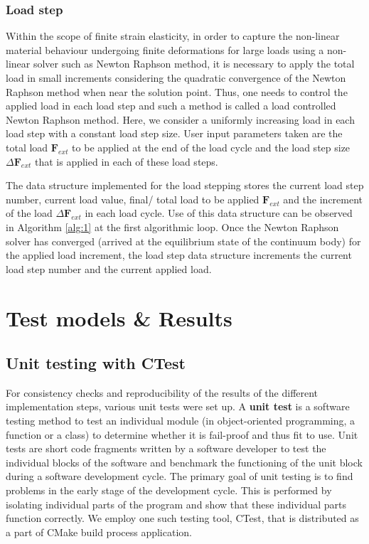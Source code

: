 \documentclass[11pt,a4paper,final]{article}
\begin{document}
\subsubsection{Load step}
Within the scope of finite strain elasticity, in order to capture the non-linear material behaviour undergoing finite deformations for large loads using a non-linear solver such as Newton Raphson method, it is necessary to apply the total load in small increments considering the quadratic convergence of the Newton Raphson method when near the solution point. Thus, one needs to control the applied load in each load step and such a method is called a load controlled Newton Raphson method. Here, we consider a uniformly increasing load in each load step with a constant load step size. User input parameters taken are the total load $\mathbf{F}_{ext}$ to be applied at the end of the load cycle and the load step size $\Delta \mathbf{F}_{ext}$ that is applied in each of these load steps. \par 
The data structure implemented for the load stepping stores the current load step number, current load value, final/ total load to be applied $\mathbf{F}_{ext}$ and the increment of the load $\Delta \mathbf{F}_{ext}$ in each load cycle. Use of this data structure can be observed in Algorithm \eqref{alg:1} at the first algorithmic loop. Once the Newton Raphson solver has converged (arrived at the equilibrium state of the continuum body) for the applied load increment, the load step data structure increments the current load step number and the current applied load.
 
\section{Test models \& Results}

\subsection{Unit testing with CTest}
For consistency checks and reproducibility of the results of the different implementation steps, various unit tests were set up. A \textbf{unit test} is a software testing method to test an individual module (in object-oriented programming, a function or a class) to determine whether it is fail-proof and thus fit to use. Unit tests are short code fragments written by a software developer to test the individual blocks of the software and benchmark the functioning of the unit block during a software development cycle. The primary goal of unit testing is to find problems in the early stage of the development cycle. This is performed by isolating individual parts of the program and show that these individual parts function correctly. We employ one such testing tool, CTest, that is distributed as a part of CMake build process application. \par 
\end{document}

